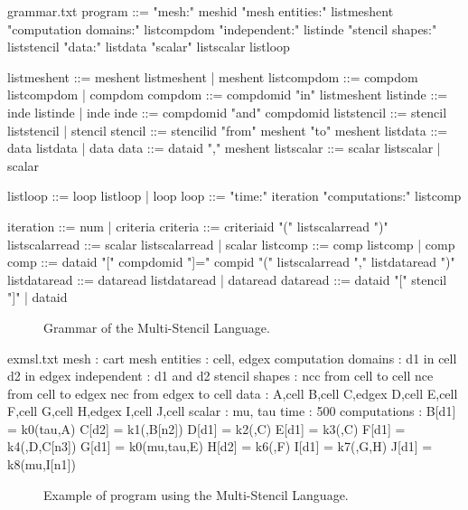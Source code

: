 \begin{filecontents*}{grammar.txt}
program ::= "mesh:" meshid 
            "mesh entities:" listmeshent
            "computation domains:" 
                      listcompdom
            "independent:"
                      listinde
            "stencil shapes:"
                      liststencil
            "data:" listdata
            "scalar" listscalar
            listloop

listmeshent ::= meshent listmeshent 
                        |  meshent
listcompdom ::= compdom listcompdom 
                        |  compdom
compdom ::= compdomid "in" listmeshent
listinde ::= inde listinde |  inde
inde ::= compdomid "and" compdomid
liststencil ::= stencil liststencil 
                        | stencil
stencil ::= stencilid "from" meshent "to" meshent
listdata ::= data listdata |  data
data ::= dataid "," meshent
listscalar ::= scalar listscalar 
                      | scalar

listloop ::= loop listloop | loop
loop ::=  "time:" iteration
          "computations:" listcomp
          
iteration ::= num | criteria
criteria ::= criteriaid "(" listscalarread ")"
listscalarread ::= scalar listscalarread 
                          |  scalar
listcomp ::= comp listcomp |  comp
comp ::= dataid "[" compdomid "]=" 
                    compid "({" 
                    listscalarread "},{" 
                    listdataread "})"
listdataread ::= dataread listdataread 
                          |  dataread
dataread ::= dataid "[" stencil "]" 
              |  dataid
\end{filecontents*}

\begin{figure}[!h]
  \hspace{5mm}
  \begin{minipage}[!h]{0.5\textwidth}
    {}   
    \caption{Grammar of the Multi-Stencil Language. \label{fig:grammar}}
  \end{minipage}
\end{figure}

\begin{filecontents*}{exmsl.txt}
mesh : cart
mesh entities : cell, edgex
computation domains :
  d1 in cell
  d2 in edgex
independent :
  d1 and d2
stencil shapes : 
  ncc from cell to cell
  nce from cell to edgex
  nec from edgex to cell
data :
  A,cell
  B,cell
  C,edgex
  D,cell
  E,cell
  F,cell
  G,cell
  H,edgex
  I,cell
  J,cell
scalar : mu, tau
time : 500
computations :
  B[d1] = k0({tau},{A})
  C[d2] = k1({},{B[n2]})
  D[d1] = k2({},{C})
  E[d1] = k3({},{C})
  F[d1] = k4({},{D,C[n3]})
  G[d1] = k0({mu,tau},{E})
  H[d2] = k6({},{F})
  I[d1] = k7({},{G,H})
  J[d1] = k8({mu},{I[n1]})
\end{filecontents*}

\begin{figure}[!h]
  \hspace{5mm}
  \begin{minipage}[!h]{0.4\textwidth}
    {}   
    \caption{Example of program using the Multi-Stencil Language. \label{fig:exmsl}}
  \end{minipage}
\end{figure}